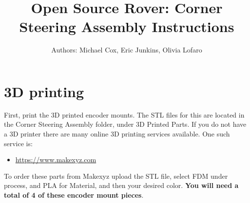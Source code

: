 \documentclass[12pt]{article}
\begin{document}
\newcommand\partimg{\includegraphics[width=2cm,height=1.25cm,keepaspectratio]}


\title{Open Source Rover: Corner Steering Assembly Instructions}
\author{Authors: Michael Cox, Eric Junkins, Olivia Lofaro}

\makeatletter
\def\@maketitle{
\begin{center}
	\makebox[\textwidth][c]{ \texttt{[image: "Pictures/Corner Title".png]}}
	{\Huge \bfseries \sffamily \@title }\\[3ex]
	{\Large \sffamily \@author}\\[3ex]
	\texttt{[image: "Pictures/JPL logo".png]}
\end{center}}
\makeatother

\maketitle



\newpage

\tableofcontents


\section{3D printing}
First, print the 3D printed encoder mounts. The STL files for this are located in the Corner Steering Assembly folder, under 3D Printed Parts. If you do not have a 3D printer there are many online 3D printing services available. One such service is:

\begin{itemize}
	\item \href{https://www.makexyz.com}{https://www.makexyz.com}
\end{itemize}
To order these parts from Makexyz upload the STL file, select FDM under process, and PLA for Material, and then your desired color. \textbf{You will need a total of 4 of these encoder mount pieces}.
\end{document}
